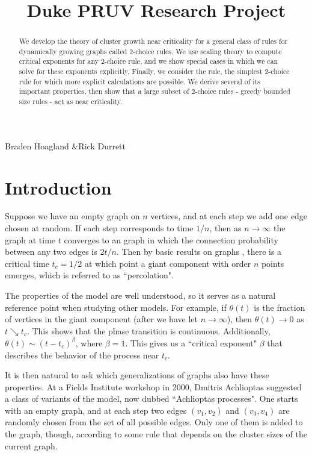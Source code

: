 \documentclass[twoside,10pt]{article}
\begin{document}

\title{Duke PRUV Research Project}{Braden Hoagland \quad\&\quad Rick Durrett}

\begin{abstract}
	We develop the theory of cluster growth near criticality for a general class of rules for dynamically growing graphs called 2-choice rules. We use scaling theory to compute critical exponents for any 2-choice rule, and we show special cases in which we can solve for these exponents explicitly. Finally, we consider the \ER rule, the simplest 2-choice rule for which more explicit calculations are possible. We derive several of its important properties, then show that a large subset of 2-choice rules - greedy bounded size rules - act as \ER near criticality.
\end{abstract}

\section{Introduction}

Suppose we have an empty graph on $n$ vertices, and at each step we add one edge chosen at random. If each step corresponds to time $1/n$, then as $n\to \infty$ the graph at time $t$ converges to an \ER graph in which the connection probability between any two edges is $2t/n$. Then by basic results on \ER graphs \cite{ER}, there is a critical time $t_{c}=1/2$ at which point a giant component with order $n$ points emerges, which is referred to as ``percolation".

The properties of the \ER model are well understood, so it serves as a natural reference point when studying other models. For example, if $\theta(t)$ is the fraction of vertices in the giant component (after we have let $n\to \infty$), then $\theta(t)\to 0$ as $t\searrow t_{c}$. This shows that the phase transition is continuous. Additionally, $\theta(t) \sim (t-t_{c})^{\beta}$, where $\beta=1$. This gives us a ``critical exponent" $\beta$ that describes the behavior of the process near $t_{c}$.

It is then natural to ask which generalizations of \ER graphs also have these properties. At a Fields Institute workshop in 2000, Dmitris Achlioptas suggested a class of variants of the \ER model, now dubbed ``Achlioptas processes". One starts with an empty graph, and at each step two edges $(v_1,v_2)$ and $(v_3,v_4)$ are randomly chosen from the set of all possible edges. Only one of them is added to the graph, though, according to some rule that depends on the cluster sizes of the current graph.
\end{document}

